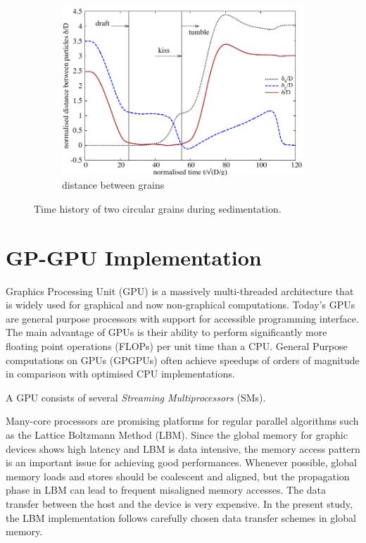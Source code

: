 \begin{figure}[tbhp]
\begin{subfigure}[b]{0.475\textwidth}
		\includegraphics[width=\textwidth]{Kissing_delta}
		\caption{distance between grains}
		\label{fig:kissdelta}
	\end{subfigure}
	\caption{Time history of two circular grains during sedimentation.}
	\label{fig:kiss}
\end{figure}

\section{GP-GPU Implementation}

Graphics Processing Unit (GPU) is a massively multi-threaded architecture that 
is widely used for graphical and now non-graphical computations. Today's GPUs 
are general purpose processors with support for accessible programming 
interface. The main advantage of GPUs is their ability to perform significantly 
more floating point operations (FLOPs) per unit time than a CPU. General 
Purpose computations on GPUs (GPGPUs) often achieve speedups of orders of 
magnitude in comparison with optimised CPU implementations. 

A GPU consists of several \emph{Streaming Multiprocessors} (SMs).  

Many-core processors are promising platforms for regular parallel 
algorithms such as the Lattice Boltzmann Method (LBM). Since the global memory 
for graphic devices shows high latency and LBM is data intensive, the
memory access pattern is an important issue for achieving good performances. 
Whenever possible, global memory loads and stores should be coalescent and 
aligned, but the propagation phase in LBM can lead to frequent misaligned 
memory accesses. The data transfer between the host and the device is very 
expensive. In the present study, the LBM implementation follows carefully 
chosen data transfer schemes in global memory.

